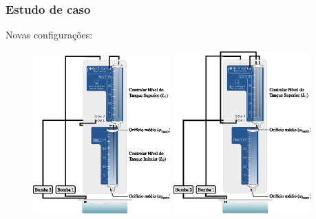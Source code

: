 \documentclass{beamer}
\begin{document}
\begin{frame}
    \frametitle{Estudo de caso}

    Novas configurações:
\begin{figure}[htb]
\centering
\subfigure
{
    \includegraphics[width=0.47\textwidth]{imgs/sistema/eps/nova_config_1}
}
\quad
\subfigure
{
    \includegraphics[width=0.47\textwidth]{imgs/sistema/eps/nova_config_2}
}
\end{figure}
\end{frame}

\end{document}
